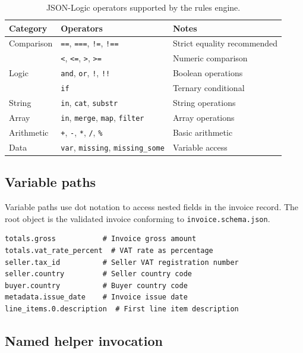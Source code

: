 \documentclass[11pt,a4paper,twoside]{report}
\begin{document}
\begin{table}[htbp]
\centering
\caption{JSON-Logic operators supported by the rules engine.}
\label{tab:jsonlogic-ops}
\footnotesize
\begin{tabularx}{\linewidth}{@{}l l X@{}}
\toprule
\textbf{Category} & \textbf{Operators} & \textbf{Notes} \\ \midrule
Comparison & \texttt{==}, \texttt{===}, \texttt{!=}, \texttt{!==} & Strict equality recommended \\
           & \texttt{<}, \texttt{<=}, \texttt{>}, \texttt{>=} & Numeric comparison \\
Logic      & \texttt{and}, \texttt{or}, \texttt{!}, \texttt{!!} & Boolean operations \\
           & \texttt{if} & Ternary conditional \\
String     & \texttt{in}, \texttt{cat}, \texttt{substr} & String operations \\
Array      & \texttt{in}, \texttt{merge}, \texttt{map}, \texttt{filter} & Array operations \\
Arithmetic & \texttt{+}, \texttt{-}, \texttt{*}, \texttt{/}, \texttt{\%} & Basic arithmetic \\
Data       & \texttt{var}, \texttt{missing}, \texttt{missing\_some} & Variable access \\
\bottomrule
\end{tabularx}
\end{table}

\subsection{Variable paths}

Variable paths use dot notation to access nested fields in the invoice record.
The root object is the validated invoice conforming to
\texttt{invoice.schema.json}.

\begin{lstlisting}[basicstyle=\ttfamily\small,caption={Example variable paths for invoice data.}]
totals.gross           # Invoice gross amount
totals.vat_rate_percent  # VAT rate as percentage
seller.tax_id          # Seller VAT registration number
seller.country         # Seller country code
buyer.country          # Buyer country code
metadata.issue_date    # Invoice issue date
line_items.0.description  # First line item description
\end{lstlisting}

\subsection{Named helper invocation}
\end{document}
